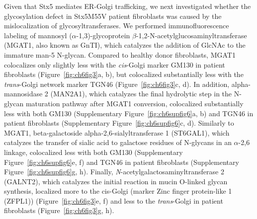 Given that Stx5 mediates ER-Golgi trafficking\cite{xu_gs15_2002,dascher_syntaxin_1994,xu_subunit_2000,hay_localization_1998,paek_ers-24_1997,zhang_ykt6_2001,linders_stx5-mediated_2019,tai_participation_2004,hay_mammalian_1996,zhang_mammalian_1997}, we next investigated whether the glycosylation defect in Stx5M55V patient fibroblasts was caused by the mislocalization of glycosyltransferases. We performed immunofluorescence labeling of mannosyl ($\alpha$-1,3)-glycoprotein $\beta$-1,2-N-acetylglucosaminyltransferase (MGAT1, also known as GnTI), which catalyzes the addition of GlcNAc to the immature man-5 N-glycan. Compared to healthy donor fibroblasts, MGAT1 colocalizes only slightly less with the \emph{cis}-Golgi marker GM130 in patient fibroblasts (Figure~\ref{fig:ch6fig3}a, b), but colocalized substantially less with the \emph{trans}-Golgi network marker TGN46 (Figure~\ref{fig:ch6fig3}c, d). In addition, alpha-mannosidase 2 (MAN2A1), which catalyzes the final hydrolytic step in the N-glycan maturation pathway after MGAT1 conversion, colocalized substantially less with both GM130 (Supplementary Figure~\ref{fig:ch6supfig6}a, b) and TGN46 in patient fibroblasts (Supplementary Figure~\ref{fig:ch6supfig6}c, d). Similarly to MGAT1, beta-galactoside alpha-2,6-sialyltransferase 1 (ST6GAL1), which catalyzes the transfer of sialic acid to galactose residues of N-glycans in an $\alpha$-2,6 linkage, colocalized less with both GM130 (Supplementary Figure~\ref{fig:ch6supfig6}e, f) and TGN46 in patient fibroblasts (Supplementary Figure~\ref{fig:ch6supfig6}g, h). Finally, \emph{N}-acetylgalactosaminyltransferase 2 (GALNT2), which catalyzes the initial reaction in mucin O-linked glycan synthesis, localized more to the cis-Golgi (marker Zinc finger protein-like 1 (ZFPL1)\cite{chiu_zfpl1_2008}) (Figure~\ref{fig:ch6fig3}e, f) and less to the \emph{trans}-Golgi in patient fibroblasts (Figure~\ref{fig:ch6fig3}g, h). 

